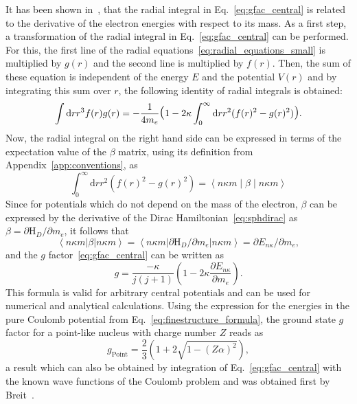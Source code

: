 It has been shown in~\cite{Karshenboim2005}, that the radial integral in Eq.~\eqref{eq:gfac_central} is related to the derivative of the electron energies with respect to its mass. As a first step, a transformation of the radial integral in Eq.~\eqref{eq:gfac_central} can be performed. For this, the first line of the radial equations~\eqref{eq:radial_equations_small} is multiplied by $g(r)$ and the second line is multiplied by $f(r)$. Then, the sum of these equation is independent of the energy $E$ and the potential $V(r)$ and by integrating this sum over $r$, the following identity of radial integrals is obtained:
\begin{equation}
\int\mathrm{d}r r^3 f(r)g(r) = -\frac{1}{4m_e}
\text{\Large(}1-2\kappa \int_0^\infty\mathrm{d}r r^2 (f(r)^2-g(r)^2)\text{\Large)}.
\end{equation}
Now, the radial integral on the right hand side can be expressed in terms of the expectation value of the $\beta$ matrix, using its definition from Appendix~\ref{app:conventions}, as
\begin{equation}
\int_0^\infty\mathrm{d}r r^2 (f(r)^2-g(r)^2)=\left<n\kappa m\middle|\beta\middle|n\kappa m\right>
\end{equation}
Since for potentials which do not depend on the mass of the electron, $\beta$ can be expressed by the derivative of the Dirac Hamiltonian~\eqref{eq:sphdirac} as $\beta = \partial\text{H}_D/\partial m_e$, it follows that
\begin{equation}
\left<n\kappa m\right|\beta\left|n\kappa m\right> = \left<n\kappa m\right|\partial\text{H}_D/\partial m_e\left|n\kappa m\right> = \partial E_{n\kappa}/\partial m_e,
\end{equation}
and the $g$ factor~\eqref{eq:gfac_central} can be written as
\begin{equation}
g = \frac{-\kappa}{j(j+1)}\left( 1-2\kappa\frac{\partial E_{n\kappa}}{\partial m_e}\right).
\label{eq:gfac_viaDeriv}
\end{equation}
This formula is valid for arbitrary central potentials and can be used for numerical and analytical calculations. Using the expression for the energies in the pure Coulomb potential from Eq.~\eqref{eq:finestructure_formula}, the ground state $g$ factor for a point-like nucleus with charge number $Z$ reads as
\begin{equation}
\label{eq:point_gfac}
g_{\text{Point}}=\frac{2}{3}\left( 1+2\sqrt{1-(Z\alpha)^2}\right),
\end{equation}
a result which can also be obtained by integration of Eq.~\eqref{eq:gfac_central} with the known wave functions of the Coulomb problem and was obtained first by Breit~\cite{breit1928}.


